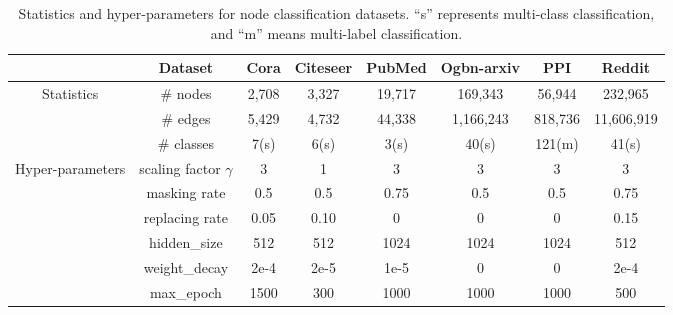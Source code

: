 \begin{table}[htbp]
\centering
\label{tab:graph_sta_hyper}
\caption{Statistics and hyper-parameters for node classification datasets. ``s'' represents multi-class classification, and ``m'' means multi-label classification. 
}
\renewcommand\tabcolsep{6.5pt}
\renewcommand\arraystretch{1.05}
\begin{tabular}{c|c|cccccc}
\toprule[1.2pt]
& Dataset               & Cora & Citeseer & PubMed & Ogbn-arxiv & PPI       & Reddit    \\
\midrule
\multirow{3}{*}{Statistics}
&         \# nodes   & 2,708 & 3,327 & 19,717 & 169,343      & 56,944  & 232,965      \\
&         \# edges   & 5,429 & 4,732 & 44,338 & 1,166,243    & 818,736 & 11,606,919   \\
&         \# classes & 7(s)  & 6(s)  & 3(s)   & 40(s)        & 121(m)  & 41(s)         \\
\midrule
\multirow{6}{*}{Hyper-parameters} 
& scaling factor $\gamma$ & 3    & 1        & 3      & 3          & 3         & 3         \\
& masking rate            & 0.5  & 0.5      & 0.75   & 0.5        & 0.5       & 0.75      \\
& replacing rate          & 0.05 & 0.10     & 0      & 0          & 0         & 0.15      \\
& hidden\_size            & 512  & 512      & 1024   & 1024       & 1024      & 512       \\
& weight\_decay           & 2e-4 & 2e-5     & 1e-5   & 0          & 0         & 2e-4      \\
& max\_epoch              & 1500 & 300      & 1000   & 1000       & 1000      & 500       \\
\bottomrule[1.2pt]
\end{tabular}
\label{tab:hp_node}
\end{table}



